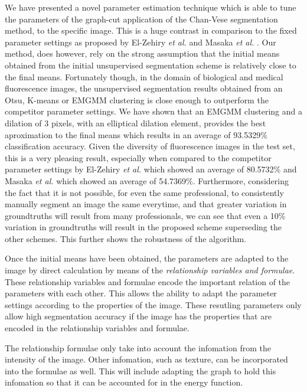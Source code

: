 We have presented a novel parameter estimation technique which is able to tune the parameters of the graph-cut application of the Chan-Vese segmentation method, to the specific image.
This is a huge contrast in comparison to the fixed parameter settings as proposed by El-Zehiry \textit{et al.} \citep{ElZehiry2007} and Masaka \textit{et al.} \citep{Maska2013}.
Our method, does however, rely on the strong assumption that the initial means obtained from the initial unsupervised segmentation scheme is relatively close to the final means. 
Fortunately though, in the domain of biological and medical fluorescence images, the unsupervised segmentation results obtained from an Otsu, K-means or EMGMM clustering is close enough to outperform the competitor parameter settings. We have shown that an EMGMM clustering and a dilation of 3 pixels, with an elliptical dilation element, provides the best aproximation to the final means which results in an average of 93.5329\% classification accuracy. Given the diversity of fluorescence images in the test set, this is a very pleasing result, especially when compared to the competitor parameter settings by El-Zehiry \textit{et al.} \citep{ElZehiry2007} which showed an average of 80.5732\% and Masaka \textit{et al.} \citep{Maska2013} which showed an average of 54.7369\%.
Furthermore, considering the fact that it is not possible, for even the same professional, to consistently manually segment an image the same everytime, and that greater variation in groundtruths will result from many professionals, we can see that even a 10\% variation in groundtruths will result in the proposed scheme superseding the other schemes. This further shows the robustness of the algorithm.

Once the initial means have been obtained, the parameters are adapted to the image by direct calculation by means of the \textit{relationship variables and formulae}. These relationship variables and formulae encode the important relation of the parameters with each other. This allows the  ability to adapt the parameter settings according to the properties of the image. These resutling parameters only allow high segmentation accuracy if the image has the properties that are encoded in the relationship variables and formulae.

The relationship formulae only take into account the infomation from the intensity of the image. Other infomation, such as texture, can be incorporated into the formulae as well. This will include adapting the graph to hold this infomation so that it can be accounted for in the energy function.

